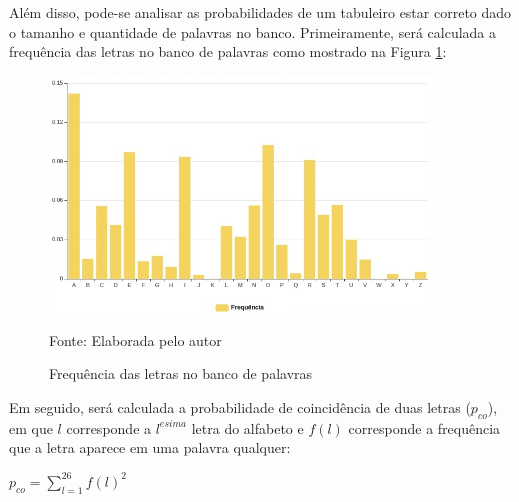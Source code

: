 Além disso, pode-se analisar as probabilidades de um tabuleiro estar correto dado o tamanho e quantidade de palavras no banco. Primeiramente, será calculada a frequência das letras no banco de palavras como mostrado na Figura \ref{fig:freqPal}:

\begin{figure}[H]
\centering
    \caption{Frequência das letras no banco de palavras}
    \label{fig:freqPal}
    \includegraphics[width=0.9\textwidth]{Figuras/frequenciaLetras.jpg}
    
    Fonte: Elaborada pelo autor
\end{figure}

Em seguido, será calculada a probabilidade de coincidência de duas letras ($p_{co}$), em que $l$ corresponde a $l^{esima}$ letra do alfabeto e $f(l)$ corresponde a frequência que a letra aparece em uma palavra qualquer:

\begin{center}
\Large{$p_{co} = \sum_{l=1}^{26}f(l)^{2}$}
\label{pco}
\end{center}


